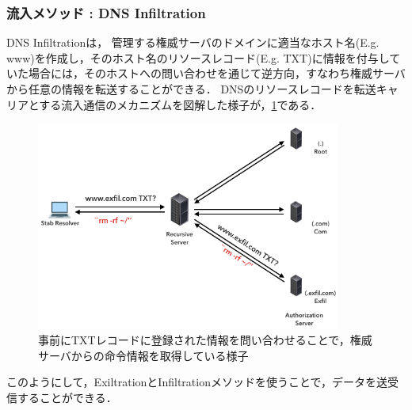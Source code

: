 
\subsubsection{流入メソッド : DNS Infiltration}
DNS Infiltrationは，
管理する権威サーバのドメインに適当なホスト名(E.g. www)を作成し，そのホスト名のリソースレコード(E.g. TXT)に情報を付与していた場合には，そのホストへの問い合わせを通じて逆方向，すなわち権威サーバから任意の情報を転送することができる．
DNSのリソースレコードを転送キャリアとする流入通信のメカニズムを図解した様子が，\ref{fig:dns-infiltration}である．

\begin{figure}[h]
 \centering
 \includegraphics[width=10.0cm]{figure/dns-infiltration.png}
 \caption{事前にTXTレコードに登録された情報を問い合わせることで，権威サーバからの命令情報を取得している様子}
 \label{fig:dns-infiltration}
\end{figure}

このようにして，ExiltrationとInfiltrationメソッドを使うことで，データを送受信することができる．

